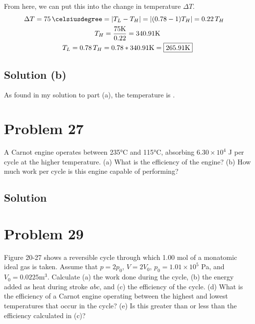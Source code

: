 \documentclass[12pt]{article}
\newcommand{\E}[1]{\times 10^{#1}}
\begin{document}
            From here, we can put this into the change in temperature $\Delta T$.
            \begin{gather}
                \begin{align}
                    \Delta T    &=  75\,\unit{\celsiusdegree}
                        =   \left| T_L - T_H \right|
                        =   \left| (0.78 - 1)T_H \right|
                        =   0.22\,T_H
                \end{align}\\
                T_H =   \frac{75\unit{\kelvin}}{0.22}
                    =   340.91\unit{\kelvin}\\
                T_L =   0.78\,T_H
                    =   0.78 * 340.91\unit{\kelvin}
                    =   \boxed{265.91\unit{\kelvin}}
            \end{gather}

        \subsection{Solution (b)}
            As found in my solution to part (a), the temperature is \boxed{265.91\unit{\kelvin}}.

    \pagebreak
    \section{Problem 27}
        A Carnot engine operates between 235\unit{\celsius} and 115\unit{\celsius}, absorbing $6.30\E{4}$ J per cycle at the higher temperature.
        (a) What is the efficiency of the engine? 
        (b) How much work per cycle is this engine capable of performing?

        \subsection{Solution}

    \section{Problem 29}
        Figure 20-27 shows a reversible cycle through which 1.00 mol of a monatomic ideal gas is taken. 
        Assume that $p = 2p_0$, $V = 2V_0$, $p_0 = 1.01 \E{5}$ Pa, and $V_0 = 0.0225 \unit{\meter^3}$. 
        Calculate (a) the work done during the cycle, (b) the energy added as heat during stroke $abc$, and (c) the efficiency of the cycle. 
        (d) What is the efficiency of a Carnot engine operating between the highest and lowest temperatures that occur in the cycle? 
        (e) Is this greater than or less than the efficiency calculated in (c)?
\end{document}
